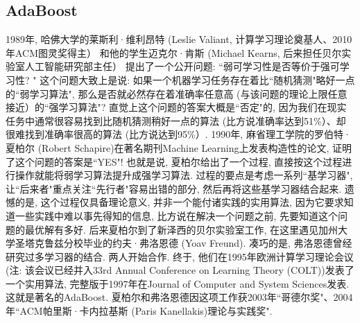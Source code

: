 \subsection{AdaBoost}
\begin{remark}
1989年, 哈佛大学的莱斯利·维利昂特 (Leslie Valiant, 计算学习理论奠基人、2010年ACM图灵奖得主） 和他的学生迈克尔·肯斯 (Michael Kearns, 后来担任贝尔实验室人工智能研究部主任） 提出了一个公开问题: “弱可学习性是否等价于强可学习性? "
这个问题大致上是说: 如果一个机器学习任务存在着比“随机猜测"略好一点的“弱学习算法", 那么是否就必然存在着准确率任意高 (与该问题的理论上限任意接近）的“强学习算法"?
直觉上这个问题的答案大概是“否定"的, 因为我们在现实任务中通常很容易找到比随机猜测稍好一点的算法 (比方说准确率达到51\%）、却很难找到准确率很高的算法 (比方说达到95\%）.
1990年, 麻省理工学院的罗伯特·夏柏尔 (Robert Schapire)在著名期刊Machine Learning上发表构造性的论文, 证明了这个问题的答案是“YES"!
也就是说, 夏柏尔给出了一个过程, 直接按这个过程进行操作就能将弱学习算法提升成强学习算法. 过程的要点是考虑一系列“基学习器", 让“后来者"重点关注“先行者"容易出错的部分, 然后再将这些基学习器结合起来.
遗憾的是, 这个过程仅具备理论意义, 并非一个能付诸实践的实用算法, 因为它要求知道一些实践中难以事先得知的信息, 比方说在解决一个问题之前, 先要知道这个问题的最优解有多好.
后来夏柏尔到了新泽西的贝尔实验室工作, 在这里遇见加州大学圣塔克鲁兹分校毕业的约夫·弗洛恩德 (Yoav Freund). 凑巧的是, 弗洛恩德曾经研究过多学习器的结合. 两人开始合作.
终于, 他们在1995年欧洲计算学习理论会议 (注: 该会议已经并入33rd Annual Conference on Learning Theory (COLT))发表了一个实用算法, 完整版于1997年在Journal of Computer and System Sciences发表. 这就是著名的AdaBoost.
夏柏尔和弗洛恩德因这项工作获2003年“哥德尔奖"、2004年“ACM帕里斯·卡内拉基斯 (Paris Kanellakis)理论与实践奖".
\end{remark}


